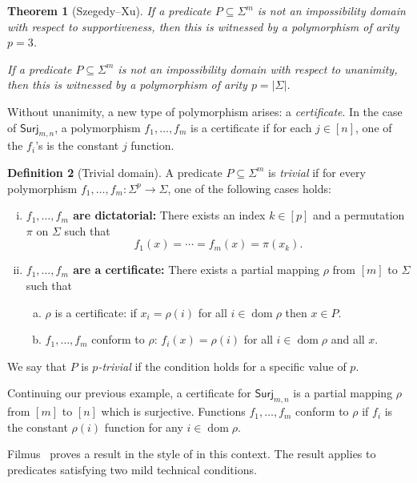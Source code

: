 \documentclass{article}
\providecommand{\Surj}{\mathsf{Surj}}
\DeclareMathOperator{\dom}{dom}
\newtheorem{theorem}{Theorem}[section]
\theoremstyle{definition}
\newtheorem{definition}[theorem]{Definition}
\theoremstyle{remark}
\begin{document}
\begin{theorem}[Szegedy--Xu]
\label{thm:szegedy-xu}
If a predicate $P \subseteq \Sigma^m$ is not an impossibility domain with respect to supportiveness, then this is witnessed by a polymorphism of arity $p=3$.

If a predicate $P \subseteq \Sigma^m$ is not an impossibility domain with respect to unanimity, then this is witnessed by a polymorphism of arity $p=|\Sigma|$.
\end{theorem}

Without unanimity, a new type of polymorphism arises: a \emph{certificate}. In the case of $\Surj_{m,n}$, a polymorphism $f_1,\dots,f_m$ is a certificate if for each $j \in [n]$, one of the $f_i$'s is the constant $j$ function.

\begin{definition}[Trivial domain]
\label{def:trivial}
A predicate $P \subseteq \Sigma^m$ is \emph{trivial} if for every polymorphism $f_1,\dots,f_m\colon \Sigma^p \to \Sigma$, one of the following cases holds:
\begin{enumerate}[(i)]
\item \textbf{$f_1,\dots,f_m$ are dictatorial:} There exists an index $k \in [p]$ and a permutation $\pi$ on $\Sigma$ such that
\[
 f_1(x) = \cdots = f_m(x) = \pi(x_k).
\]
\item \textbf{$f_1,\dots,f_m$ are a certificate:} There exists a partial mapping $\rho$ from $[m]$ to $\Sigma$ such that
\begin{enumerate}[(a)]
\item $\rho$ is a certificate: if $x_i = \rho(i)$ for all $i \in \dom\rho$ then $x \in P$.
\item $f_1,\dots,f_m$ conform to $\rho$: $f_i(x) = \rho(i)$ for all $i \in \dom\rho$ and all $x$.
\end{enumerate}
\end{enumerate}
We say that $P$ is \emph{$p$-trivial} if the condition holds for a specific value of $p$.
\end{definition}

Continuing our previous example, a certificate for $\Surj_{m,n}$ is a partial mapping $\rho$ from $[m]$ to $[n]$ which is surjective. Functions $f_1,\dots,f_m$ conform to $\rho$ if $f_i$ is the constant $\rho(i)$ function for any $i \in \dom\rho$.

Filmus~\cite{Filmus26} proves a result in the style of  in this context. The result applies to predicates satisfying two mild technical conditions.
\end{document}
